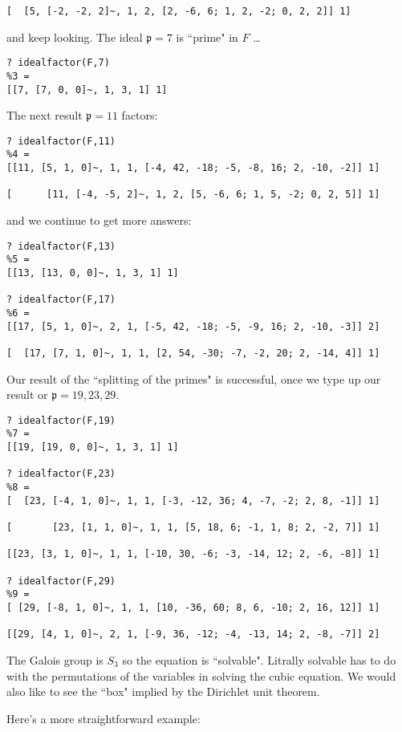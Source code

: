 \documentclass[12pt]{article}
\begin{document}
{\begin{verbatim}
[  [5, [-2, -2, 2]~, 1, 2, [2, -6, 6; 1, 2, -2; 0, 2, 2]] 1]
\end{verbatim}
and keep looking.  The ideal $\mathfrak{p} = 7$ is ``prime" in $F$ \dots
\begin{verbatim}
? idealfactor(F,7)
%3 = 
[[7, [7, 0, 0]~, 1, 3, 1] 1]
\end{verbatim}
The next result $\mathfrak{p} = 11$ factors:
\begin{verbatim}
? idealfactor(F,11)
%4 = 
[[11, [5, 1, 0]~, 1, 1, [-4, 42, -18; -5, -8, 16; 2, -10, -2]] 1]

[      [11, [-4, -5, 2]~, 1, 2, [5, -6, 6; 1, 5, -2; 0, 2, 5]] 1]
\end{verbatim}
and we continue to get more answers:
\begin{verbatim}
? idealfactor(F,13)
%5 = 
[[13, [13, 0, 0]~, 1, 3, 1] 1]

? idealfactor(F,17)
%6 = 
[[17, [5, 1, 0]~, 2, 1, [-5, 42, -18; -5, -9, 16; 2, -10, -3]] 2]

[  [17, [7, 1, 0]~, 1, 1, [2, 54, -30; -7, -2, 20; 2, -14, 4]] 1]
\end{verbatim}
Our result of the ``splitting of the primes" is successful, once we type up our result or $\mathfrak{p} = 19, 23, 29$.
\begin{verbatim}
? idealfactor(F,19)
%7 = 
[[19, [19, 0, 0]~, 1, 3, 1] 1]

? idealfactor(F,23)
%8 = 
[  [23, [-4, 1, 0]~, 1, 1, [-3, -12, 36; 4, -7, -2; 2, 8, -1]] 1]

[       [23, [1, 1, 0]~, 1, 1, [5, 18, 6; -1, 1, 8; 2, -2, 7]] 1]

[[23, [3, 1, 0]~, 1, 1, [-10, 30, -6; -3, -14, 12; 2, -6, -8]] 1]

? idealfactor(F,29)
%9 = 
[ [29, [-8, 1, 0]~, 1, 1, [10, -36, 60; 8, 6, -10; 2, 16, 12]] 1]

[[29, [4, 1, 0]~, 2, 1, [-9, 36, -12; -4, -13, 14; 2, -8, -7]] 2]
\end{verbatim}
The Galois group is $S_3$ so the equation is ``solvable".  Litrally solvable has to do with the permutations of the variables in solving the cubic equation.  We would also like to see the ``box" implied by the Dirichlet unit theorem.

\newpage

\noindent Here's a more straightforward example:

}
\end{document}
